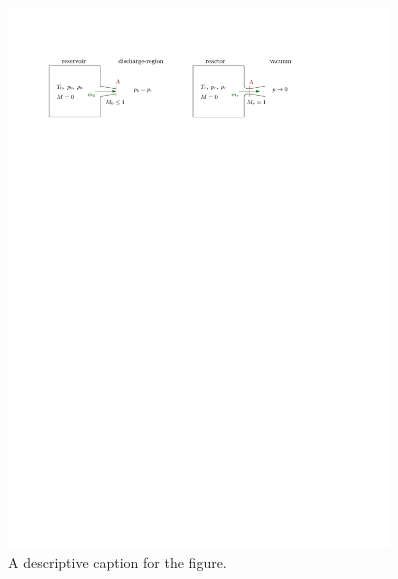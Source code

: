 \begin{figure}[H]
    \centering
    \includegraphics[width=0.9\textwidth]{src/03_analytical-work/fig_disconnected-reservoirs.pdf}
    \caption{A descriptive caption for the figure.}
    \label{fig:disconnected-reservoirs}
\end{figure}

